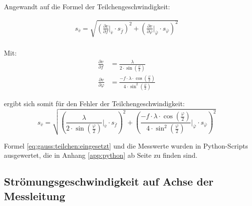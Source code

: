 Angewandt auf die Formel der Teilchengeschwindigkeit:

\begin{equation}
    \label{eq:gauss:teilchen}
    \begin{split}
        s_{\overline{v}} = \sqrt{ \left( \frac{\partial v}{\partial f}       \biggr\rvert_{\overline{v}}       \cdot s_{\overline{f}}       \right)^2
                                + \left( \frac{\partial v}{\partial \varphi} \biggr\rvert_{\overline{\varphi}} \cdot s_{\overline{\varphi}} \right)^2
                                } \\
    \end{split}
\end{equation}

Mit:
\begin{align}
    \label{eq:partials}
    \frac{\partial v}{\partial f}       &= \frac{\lambda}{2 \cdot \sin \left( \frac{\varphi}{2} \right) } \\
    \frac{\partial v}{\partial \varphi} &= \frac{-f \cdot \lambda \cdot \cos\left(\frac{\varphi}{2}\right)}{4 \cdot \sin^2\left(\frac{\varphi}{2}\right)}
\end{align}

ergibt sich somit f\"ur den Fehler der Teilchengeschwindigkeit:
\begin{equation}
    \label{eq:gauss:teilchen:eingesetzt}
    s_{\overline{v}} = \sqrt{ \left( \frac{\lambda}                                                    {2 \cdot \sin  \left( \frac{\varphi}{2} \right)} \biggr\rvert_{\overline{v}}       \cdot s_{\overline{f}}       \right)^2
                            + \left( \frac{-f \cdot \lambda \cdot \cos\left( \frac{\varphi}{2} \right)}{4 \cdot \sin^2\left( \frac{\varphi}{2} \right)} \biggr\rvert_{\overline{\varphi}} \cdot s_{\overline{\varphi}} \right)^2
                            }
\end{equation}

Formel   \ref{eq:gauss:teilchen:eingesetzt}  und   die  Messwerte   wurden  in
Python-Scripts   ausgewertet,  die   in  Anhang   \ref{app:python}  ab   Seite
\pageref{app:python} zu finden sind.



\clearpage
\subsection{Str\"omungsgeschwindigkeit auf Achse der Messleitung}
\label{subsec:achse}


